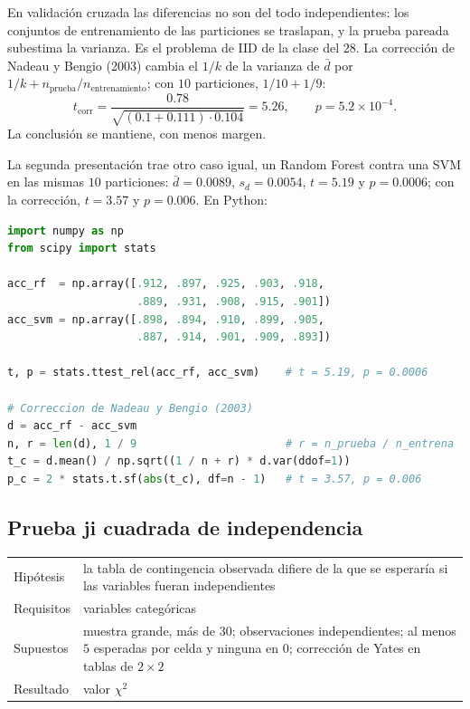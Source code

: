 \documentclass[11pt,letterpaper]{article}
\begin{document}
\begin{ojo}
    En validación cruzada las diferencias no son del todo
    independientes: los conjuntos de entrenamiento de las particiones
    se traslapan, y la prueba pareada subestima la varianza. Es el
    problema de IID de la clase del $28$. La corrección de Nadeau y
    Bengio (2003) cambia el $1/k$ de la varianza de $\bar{d}$ por
    $1/k + n_{\text{prueba}} / n_{\text{entrenamiento}}$; con $10$
    particiones, $1/10 + 1/9$:
    \[
        t_{\text{corr}} = \frac{0.78}{\sqrt{(0.1 + 0.111) \cdot 0.104}}
        = 5.26 , \qquad p = 5.2 \times 10^{-4} .
    \]
    La conclusión se mantiene, con menos margen.
\end{ojo}

La segunda presentación trae otro caso igual, un Random Forest contra
una SVM en las mismas $10$ particiones: $\bar{d} = 0.0089$,
$s_d = 0.0054$, $t = 5.19$ y $p = 0.0006$; con la corrección,
$t = 3.57$ y $p = 0.006$. En Python:

\begin{lstlisting}[language=Python]
import numpy as np
from scipy import stats

acc_rf  = np.array([.912, .897, .925, .903, .918,
                    .889, .931, .908, .915, .901])
acc_svm = np.array([.898, .894, .910, .899, .905,
                    .887, .914, .901, .909, .893])

t, p = stats.ttest_rel(acc_rf, acc_svm)    # t = 5.19, p = 0.0006

# Correccion de Nadeau y Bengio (2003)
d = acc_rf - acc_svm
n, r = len(d), 1 / 9                       # r = n_prueba / n_entrena
t_c = d.mean() / np.sqrt((1 / n + r) * d.var(ddof=1))
p_c = 2 * stats.t.sf(abs(t_c), df=n - 1)   # t = 3.57, p = 0.006
\end{lstlisting}


\subsection*{Prueba ji cuadrada de independencia}

\begin{center}
\small
\begin{tabular}{l>{\raggedright\arraybackslash}p{10.5cm}}
    \toprule
    Hipótesis & la tabla de contingencia observada difiere de la que se
                esperaría si las variables fueran independientes \\
    Requisitos & variables categóricas \\
    Supuestos & muestra grande, más de $30$; observaciones
                independientes; al menos $5$ esperadas por celda y
                ninguna en $0$; corrección de Yates en tablas de
                $2 \times 2$ \\
    Resultado & valor $\chi^2$ \\
    \bottomrule
\end{tabular}
\end{center}
\end{document}
